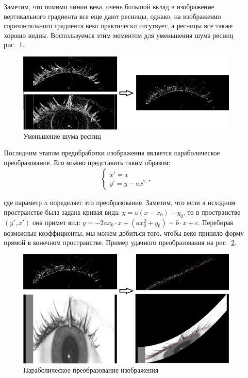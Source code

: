\documentclass[12pt]{article} %
\begin{document}
Заметим, что помимо линии века, очень большой вклад в изображение вертикального градиента все еще дают ресницы, однако, на изображении горизонтального градиента веко практически отсутвует, а ресницы все также хорошо видны. Воспользуемся этим моментом для уменьшения шума ресниц рис.~\ref{fig:diff}.
\begin{figure}[h]
	
	\centering
	
	\includegraphics[width=0.8\linewidth]{diff.jpg}
	
	\caption{Уменьшение шума ресниц}
	
	\label{fig:diff}
	
\end{figure}

Последним этапом предобработки изображения является параболическое преобразование. Его можно представить таким образом:
\begin{gather}\label{parab2}
\begin{cases}
		x' = x
		\\
		y' = y - ax^2
	\end{cases},
\end{gather}

где параметр $a$ определяет это преобразование. Заметим, что если в исходном пространстве была задана кривая вида: $y = a(x-x_0) + y_0$, то в пространстве $(y', x')$ она примет вид: $y = -2ax_0\cdot x + (ax_0^2 + y_0) = b\cdot x + c$. Перебирая возможные коэффициенты, мы можем добиться того, чтобы веко приняло форму прямой в конечном пространстве. Пример удачного преобразования на рис.~\ref{fig:parab}.

\begin{figure}[h]
	
	\centering
	
	\includegraphics[width=0.8\linewidth]{parab.jpg}
	
	\caption{Параболическое преобразование изображения}
	
	\label{fig:parab}
	
\end{figure}
\end{document}
